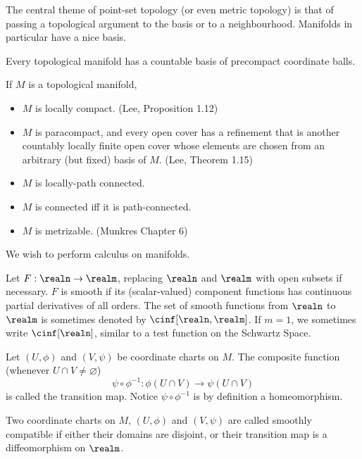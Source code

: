 \documentclass[../main-v2-manifolds.tex]{subfiles}
\begin{document}
The central theme of point-set topology (or even metric topology) is that of passing a topological argument to the basis or to a neighbourhood. Manifolds in particular have a nice basis.
\begin{wts}
    Every topological manifold has a countable basis of precompact coordinate balls.
\end{wts}
\begin{wts}
If $M$ is a topological manifold, 
\begin{itemize}
    \item $M$ is locally compact. (Lee, Proposition 1.12)
    \item $M$ is paracompact, and every open cover has a refinement 
    that is another countably locally finite open cover whose elements are chosen from an arbitrary (but fixed) basis of $M$. (Lee, Theorem 1.15)
    \item $M$ is locally-path connected.
    \item $M$ is connected iff it is path-connected.
    \item $M$ is metrizable. (Munkres Chapter 6)
\end{itemize}
\end{wts}

We wish to perform calculus on manifolds.
\begin{definition}\label{lee-chp1:real-smooth-function}
    Let $F:\realn\to\realm$, replacing $\realn$ and $\realm$ with open subsets if necessary. $F$ is smooth if its (scalar-valued) component functions has continuous partial derivatives of all orders. The set of smooth functions from $\realn$ to $\realm$ is sometimes denoted by $\cinf[\realn,\realm]$. If $m=1$, we sometimes write $\cinf[\realn]$, similar to a test function on the Schwartz Space.
\end{definition}

\begin{definition}\label{lee-chp1:transition-maps}
    Let $(U,\phi)$ and $(V,\psi)$ be coordinate charts on $M$. The composite function (whenever $U\cap V\neq\varnothing$) 
    \[
    \psi\circ\phi^{-1}:\phi(U\cap V)\to\psi(U\cap V)
    \] 
    is called the transition map. Notice $\psi\circ\phi^{-1}$ is by definition a homeomorphism.
\end{definition}

\begin{definition}\label{lee-chp1:smoothly-compatible}
    Two coordinate charts on $M$, $(U,\phi)$ and $(V,\psi)$ are called smoothly compatible if either their domains are disjoint, or their transition map is a diffeomorphism on $\realm$.
\end{definition}
\end{document}
